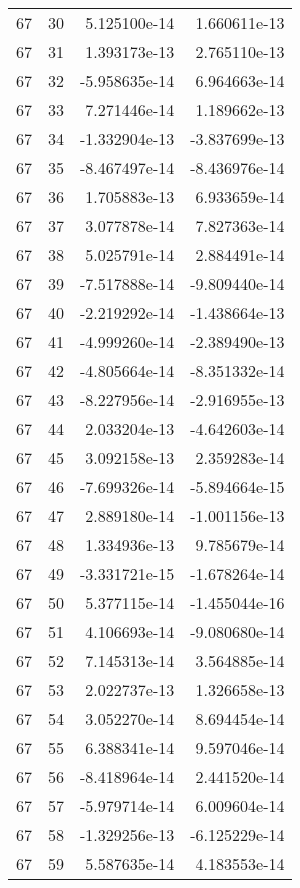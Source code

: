 \begin{tabular}{rrrr}
  67 &   30 &  5.125100e-14 &  1.660611e-13 \\
  67 &   31 &  1.393173e-13 &  2.765110e-13 \\
  67 &   32 & -5.958635e-14 &  6.964663e-14 \\
  67 &   33 &  7.271446e-14 &  1.189662e-13 \\
  67 &   34 & -1.332904e-13 & -3.837699e-13 \\
  67 &   35 & -8.467497e-14 & -8.436976e-14 \\
  67 &   36 &  1.705883e-13 &  6.933659e-14 \\
  67 &   37 &  3.077878e-14 &  7.827363e-14 \\
  67 &   38 &  5.025791e-14 &  2.884491e-14 \\
  67 &   39 & -7.517888e-14 & -9.809440e-14 \\
  67 &   40 & -2.219292e-14 & -1.438664e-13 \\
  67 &   41 & -4.999260e-14 & -2.389490e-13 \\
  67 &   42 & -4.805664e-14 & -8.351332e-14 \\
  67 &   43 & -8.227956e-14 & -2.916955e-13 \\
  67 &   44 &  2.033204e-13 & -4.642603e-14 \\
  67 &   45 &  3.092158e-13 &  2.359283e-14 \\
  67 &   46 & -7.699326e-14 & -5.894664e-15 \\
  67 &   47 &  2.889180e-14 & -1.001156e-13 \\
  67 &   48 &  1.334936e-13 &  9.785679e-14 \\
  67 &   49 & -3.331721e-15 & -1.678264e-14 \\
  67 &   50 &  5.377115e-14 & -1.455044e-16 \\
  67 &   51 &  4.106693e-14 & -9.080680e-14 \\
  67 &   52 &  7.145313e-14 &  3.564885e-14 \\
  67 &   53 &  2.022737e-13 &  1.326658e-13 \\
  67 &   54 &  3.052270e-14 &  8.694454e-14 \\
  67 &   55 &  6.388341e-14 &  9.597046e-14 \\
  67 &   56 & -8.418964e-14 &  2.441520e-14 \\
  67 &   57 & -5.979714e-14 &  6.009604e-14 \\
  67 &   58 & -1.329256e-13 & -6.125229e-14 \\
  67 &   59 &  5.587635e-14 &  4.183553e-14 \\

\end{tabular}
